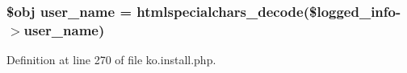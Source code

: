 \hypertarget{ko_8install_8php_a115401aff7da80e73c66e9f76505426b}{}
\subsubsection[{user\+\_\+name}]{\setlength{\rightskip}{0pt plus 5cm}\$obj user\+\_\+name = htmlspecialchars\+\_\+decode(\$logged\+\_\+info-\/$>$user\+\_\+name)}\label{ko_8install_8php_a115401aff7da80e73c66e9f76505426b}


Definition at line 270 of file ko.\+install.\+php.


